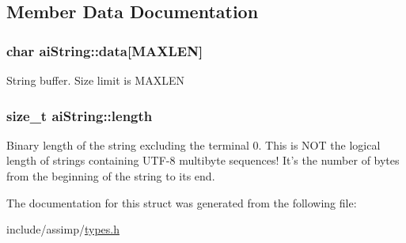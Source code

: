\subsection{\-Member \-Data \-Documentation}
\hypertarget{structaiString_aa90b1da7d347a3dcca0a95061e6ea41d}{
\subsubsection[{data}]{\setlength{\rightskip}{0pt plus 5cm}char {\bf ai\-String\-::data}\mbox{[}{\bf \-M\-A\-X\-L\-E\-N}\mbox{]}}}\label{structaiString_aa90b1da7d347a3dcca0a95061e6ea41d}
\-String buffer. \-Size limit is \-M\-A\-X\-L\-E\-N \hypertarget{structaiString_a7d77c2031ff0340746aa046f7fbcf313}{
\subsubsection[{length}]{\setlength{\rightskip}{0pt plus 5cm}size\-\_\-t {\bf ai\-String\-::length}}}\label{structaiString_a7d77c2031ff0340746aa046f7fbcf313}
\-Binary length of the string excluding the terminal 0. \-This is \-N\-O\-T the logical length of strings containing \-U\-T\-F-\/8 multibyte sequences! \-It's the number of bytes from the beginning of the string to its end. 

\-The documentation for this struct was generated from the following file\-:\begin{DoxyCompactItemize}
\item 
include/assimp/\hyperlink{types_8h}{types.\-h}\end{DoxyCompactItemize}
